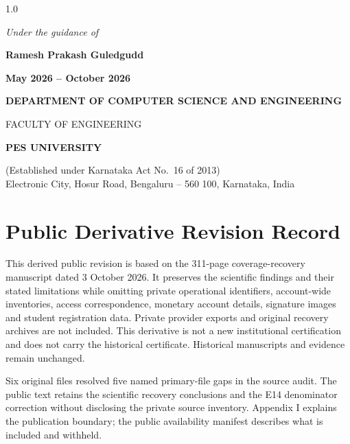 \begin{titlepage}
\begin{spacing}{1.0}
\vspace{0.5em}
{\normalsize\itshape Under the guidance of\par}
\vspace{0.2em}
{\large\bfseries Ramesh Prakash Guledgudd\par}

\vspace{0.6em}
{\normalsize\bfseries\color{pesmaroon} May 2026 -- October 2026\par}

\vfill

{\normalsize\bfseries DEPARTMENT OF COMPUTER SCIENCE AND ENGINEERING\par}
{\normalsize FACULTY OF ENGINEERING\par}
{\large\bfseries PES UNIVERSITY\par}
{\footnotesize (Established under Karnataka Act No.\ 16 of 2013)\\
Electronic City, Hosur Road, Bengaluru -- 560 100, Karnataka, India\par}
\end{spacing}
\end{titlepage}



\chapter*{Public Derivative Revision Record}
This derived public revision is based on the 311-page coverage-recovery manuscript dated 3 October 2026. It preserves the scientific findings and their stated limitations while omitting private operational identifiers, account-wide inventories, access correspondence, monetary account details, signature images and student registration data. Private provider exports and original recovery archives are not included. This derivative is not a new institutional certification and does not carry the historical certificate. Historical manuscripts and evidence remain unchanged.

Six original files resolved five named primary-file gaps in the source audit. The public text retains the scientific recovery conclusions and the E14 denominator correction without disclosing the private source inventory. Appendix I explains the publication boundary; the public availability manifest describes what is included and withheld.

